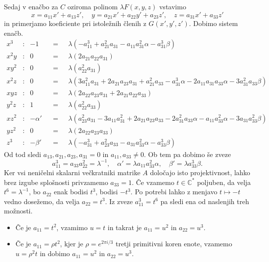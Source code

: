 \documentclass[mat1]{fmfdelo}
\numberwithin{equation}{section}
\newcommand{\CM}{\mathbb C ^*}
\newcommand{\inv}{^{-1}}
\theoremstyle{definition}
\begin{document}
\begin{dokaz}
    Sedaj v enačbo za $C$ oziroma polinom $\lambda F(x,y,z)$ vstavimo 
    \[
        x = a_{11}x' + a_{13}z', \quad y = a_{21}x' + a_{22}y' + a_{23}z', \quad z = a_{31}x' + a_{33}z' 
    \]
    in primerjamo koeficiente pri istoležnih členih z $G(x', y', z')$. Dobimo sistem enačb.
    \begin{align*}
        x^3 &: & -1 && = \text{ }& \lambda (-a_{11}^3 + a_{21}^2 a_{31} - a_{11} a_{31}^2 \alpha - a_{31}^3 \beta) \\
        x^2y &: & 0 && = \text{ }& \lambda (2 a_{21} a_{22} a_{31}) \\
        xy^2 &: & 0 && = \text{ }& \lambda (a_{22}^2 a_{31}) \\
        x^2z &: & 0 && = \text{ }& \lambda (3 a_{11}^2 a_{31} + 2 a_{21} a_{23} a_{31} + a_{21}^2 a_{33} - 
        a_{31}^3 \alpha - 2 a_{11} a_{31} a_{33} \alpha - 3 a_{31}^2 a_{33} \beta) \\
        xyz  &: & 0 && = \text{ }& \lambda (2 a_{22} a_{23} a_{31} + 2 a_{21} a_{22} a_{33}) \\
        y^2z &: & 1 && = \text{ }& \lambda (a_{22}^2 a_{33}) \\
        xz^2 &: & -\alpha' && = \text{ }& \lambda (a_{23}^2 a_{31} - 3 a_{11} a_{31}^2 + 2 a_{21} a_{23} a_{33} - 
        2 a_{31}^2 a_{33} \alpha - a_{11} a_{33}^2 \alpha - 3 a_{31} a_{33}^2 \beta) \\
        yz^2 &: & 0 && = \text{ }& \lambda (2 a_{22} a_{23} a_{33} ) \\
        z^3 &: & -\beta' && = \text{ }& \lambda (-a_{31}^3 + a_{23}^2 a_{33} - a_{31} a_{33}^2 \alpha - a_{33}^3 \beta)
    \end{align*}
    Od tod sledi $a_{13}, a_{21}, a_{23}, a_{31} = 0$ in $a_{11}, a_{33} \neq 0$. Ob tem pa dobimo še zveze
    \[
        a_{11}^3 = a_{33}a_{22}^2 = \lambda\inv, \quad \alpha' = \lambda a_{11}a_{33}^2 \alpha, \quad \beta' = \lambda a_{33}^3 \beta.
    \]
    Ker vsi neničelni skalarni večkratniki matrike $A$ določajo isto projektivnost, lahko brez izgube splošnosti privzamemo $a_{33} = 1$. Če vzamemo $t \in \CM$ poljuben, da velja $t^6 = \lambda\inv$, bo $a_{22}$ enak bodisi $t^3$, bodisi $-t^3$. Po potrebi lahko z menjavo $t \mapsto -t$ vedno dosežemo, da velja $a_{22} = t^3$. Iz zveze $a_{11}^3 = t^6$ pa sledi ena od naslenjih treh možnosti.
    \begin{itemize}
        \item Če je $a_{11} = t^2$, vzamimo $u = t$ in takrat je $a_{11} = u^2$ in $a_{22} = u^3$.
        \item Če je $a_{11} = \rho t^2$, kjer je $\rho = e^{2\pi i/3}$ tretji primitivni koren enote, vzamemo $u = \rho^2 t$ in dobimo $a_{11} = u^2$ in $a_{22} = u^3$.

\end{itemize}
\end{dokaz}
\end{document}
